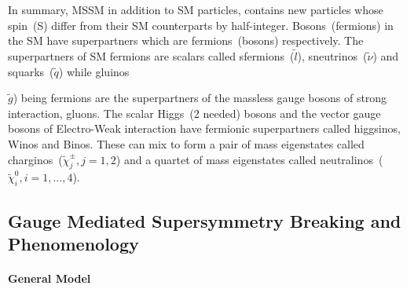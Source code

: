 In summary, MSSM in addition to SM particles, contains new particles whose spin~(S) differ from their SM counterparts by half-integer. Bosons~(fermions) in the SM have superpartners which are fermions~(bosons) respectively.
The superpartners of SM fermions are scalars called sfermions~($\tilde{l}$), sneutrinos~($\tilde{\nu}$) and squarks~($\tilde{q}$) while gluinos~{$\tilde{g}$) being fermions are the superpartners of the massless gauge bosons of strong interaction, gluons. The scalar Higgs~(2 needed) bosons and the vector gauge bosons of Electro-Weak interaction have fermionic superpartners called higgsinos, Winos and Binos. These can mix to form a pair of mass eigenstates called charginos~($\tilde{\chi}^{\pm}_{j}, j=1,2$) and a quartet of mass  eigenstates called neutralinos~($\tilde{\chi}^{0}_{i}, i=1,...,4$).
\subsection{Gauge Mediated Supersymmetry Breaking and Phenomenology}
\paragraph{General Model}
}
